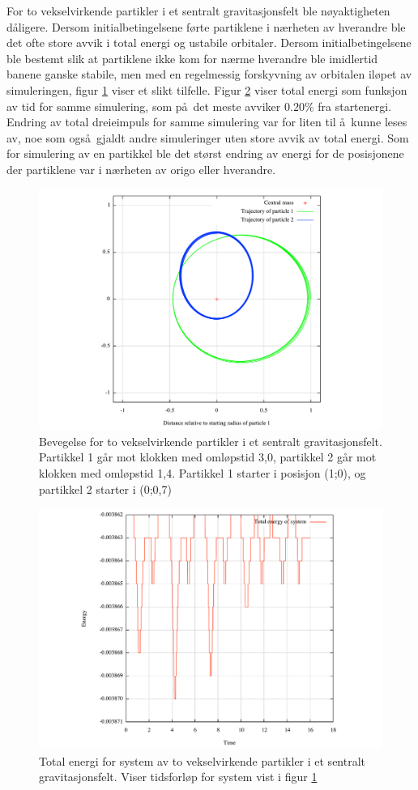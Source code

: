 \documentclass[5p]{elsarticle}        %
\begin{document}
For to vekselvirkende partikler i et sentralt gravitasjonsfelt ble n\o yaktigheten d\aa ligere. Dersom initialbetingelsene f\o rte partiklene i n\ae rheten av hverandre ble det ofte store avvik i total energi og ustabile orbitaler. Dersom initialbetingelsene ble bestemt slik at partiklene ikke kom for n\ae rme hverandre ble imidlertid banene ganske stabile, men med en regelmessig forskyvning av orbitalen il\o pet av simuleringen, figur \ref{2pos} viser et slikt tilfelle. Figur \ref{2energi} viser total energi som funksjon av tid for samme simulering, som p\aa \ det meste avviker $0.20\%$ fra startenergi. Endring av total dreieimpuls for samme simulering var for liten til \aa \ kunne leses av, noe som ogs\aa \ gjaldt andre simuleringer uten store avvik av total energi. Som for simulering av en partikkel ble det st\o rst endring av energi for de posisjonene der partiklene var i n\ae rheten av origo eller hverandre.

\begin{figure}[t] 
	\begin{center}
		\includegraphics[width=.55\textwidth,center]{two_particles_position.pdf} 
	\end{center}
		\caption{Bevegelse for to vekselvirkende partikler i et sentralt gravitasjonsfelt. Partikkel 1 g\aa r mot klokken med oml\o pstid 3,0, partikkel 2 g\aa r mot klokken med oml\o pstid 1,4. Partikkel 1 starter i posisjon (1;0), og partikkel 2 starter i (0;0,7)} 
		\label{2pos} %
\end{figure}
\begin{figure}[h] 
	\begin{center}
		\includegraphics[width=.55\textwidth,center]{two_particles_energy.pdf} 
	\end{center}
		\caption{Total energi for system av to vekselvirkende partikler i et sentralt gravitasjonsfelt. Viser tidsforl\o p for system vist i figur \ref{2pos}} 
		\label{2energi} %
\end{figure}
\end{document}

